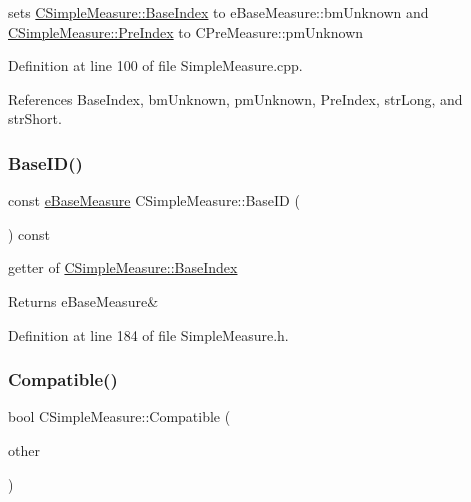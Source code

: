 sets \hyperlink{classCSimpleMeasure_a191dbfa4cc374946bf8a82111f827d92}{C\+Simple\+Measure\+::\+Base\+Index} to e\+Base\+Measure\+::bm\+Unknown and \hyperlink{classCSimpleMeasure_aa23ed9eec21adb9a97c90a424e7ee18a}{C\+Simple\+Measure\+::\+Pre\+Index} to C\+Pre\+Measure\+::pm\+Unknown 



Definition at line 100 of file Simple\+Measure.\+cpp.



References Base\+Index, bm\+Unknown, pm\+Unknown, Pre\+Index, str\+Long, and str\+Short.

\mbox{\label{classCSimpleMeasure_a8b523b4264aed1ccae15fd39cc7e31f4}} 
\subsubsection{\texorpdfstring{Base\+I\+D()}{BaseID()}}
{\footnotesize\ttfamily const \hyperlink{BaseMeasure_8h_ac90e5164ccf1f0d648fba7e94b229a11}{e\+Base\+Measure} C\+Simple\+Measure\+::\+Base\+ID (\begin{DoxyParamCaption}{ }\end{DoxyParamCaption}) const\hspace{0.3cm}{\ttfamily [inline]}}



getter of \hyperlink{classCSimpleMeasure_a191dbfa4cc374946bf8a82111f827d92}{C\+Simple\+Measure\+::\+Base\+Index} 

\begin{DoxyReturn}{Returns}
e\+Base\+Measure\& 
\end{DoxyReturn}


Definition at line 184 of file Simple\+Measure.\+h.

\mbox{\label{classCSimpleMeasure_a0879e6127b863b5dfe4943e6b91695d2}} 
\subsubsection{\texorpdfstring{Compatible()}{Compatible()}}
{\footnotesize\ttfamily bool C\+Simple\+Measure\+::\+Compatible (\begin{DoxyParamCaption}\item[{const \hyperlink{classCSimpleMeasure}{C\+Simple\+Measure} \&}]{other }\end{DoxyParamCaption})\hspace{0.3cm}{\ttfamily [inline]}}



